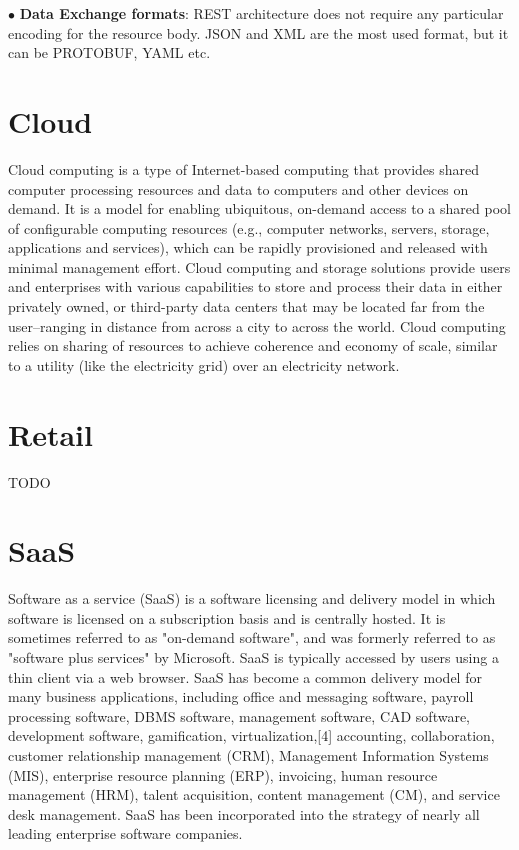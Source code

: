 $\bullet$ \textbf{Data Exchange formats}: REST architecture does not require any particular
encoding for the resource body. JSON and XML are the most used format, but it
can be PROTOBUF, YAML etc. 

\section{Cloud}

Cloud computing is a type of Internet-based computing that provides shared
computer processing resources and data to computers and other devices on demand.
It is a model for enabling ubiquitous, on-demand access to a shared pool of
configurable computing resources (e.g., computer networks, servers, storage,
applications and services), which can be rapidly provisioned and released
with minimal management effort. Cloud computing and storage solutions provide
users and enterprises with various capabilities to store and process their data
in either privately owned, or third-party data centers that may be located
far from the user–ranging in distance from across a city to across the world.
Cloud computing relies on sharing of resources to achieve coherence and economy
of scale, similar to a utility (like the electricity grid) over an electricity
network.

\section{Retail}
TODO

\section{SaaS}
Software as a service (SaaS) is a software licensing and
delivery model in which software is licensed on a subscription basis and is
centrally hosted. It is sometimes referred to as "on-demand software",
and was formerly referred to as "software plus services" by Microsoft. SaaS
is typically accessed by users using a thin client via a web browser. SaaS has
become a common delivery model for many business applications, including office
and messaging software, payroll processing software, DBMS software, management
software, CAD software, development software, gamification, virtualization,[4]
accounting, collaboration, customer relationship management (CRM), Management
Information Systems (MIS), enterprise resource planning (ERP), invoicing, human
resource management (HRM), talent acquisition, content management (CM), and
service desk management. SaaS has been incorporated into the strategy of
nearly all leading enterprise software companies.

